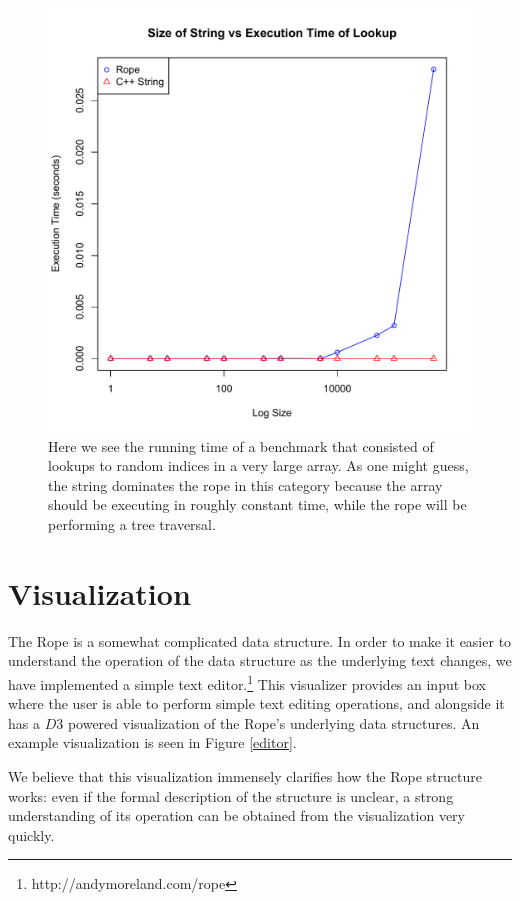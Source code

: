 \documentclass[12pt]{article}
\begin{document}
\begin{figure}[p]
\begin{centering}
\includegraphics[scale=1.0]{size_vs_lookup}
\caption{Here we see the running time of a benchmark that consisted of lookups to random indices in a very large array. As one might guess, the string dominates the rope in this category because the array should be executing in roughly constant time, while the rope will be performing a tree traversal.}
\end{centering}
\end{figure}

\section{Visualization}

The Rope is a somewhat complicated data structure. In order to make it easier to understand the operation of the data structure as the underlying text changes, we have implemented a simple text editor.\footnote{http://andymoreland.com/rope} This visualizer provides an input box where the user is able to perform simple text editing operations, and alongside it has a $D3$ powered visualization of the Rope's underlying data structures. An example visualization is seen in Figure \ref{editor}.

We believe that this visualization immensely clarifies how the Rope structure works: even if the formal description of the structure is unclear, a strong understanding of its operation can be obtained from the visualization very quickly.
\end{document}
